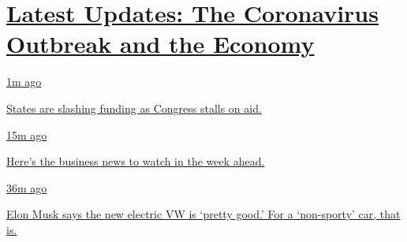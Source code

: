 \hypertarget{latest-updates-the-coronavirus-outbreak-and-the-economy}{%
\section{\texorpdfstring{\href{https://www.nytimes3xbfgragh.onion/live/2020/09/08/business/stock-market-today-coronavirus?action=click\&pgtype=Article\&state=default\&region=MAIN_CONTENT_1\&context=storylines_live_updates}{Latest
Updates: The Coronavirus Outbreak and the
Economy}}{Latest Updates: The Coronavirus Outbreak and the Economy}}\label{latest-updates-the-coronavirus-outbreak-and-the-economy}}

\href{https://www.nytimes3xbfgragh.onion/live/2020/09/08/business/stock-market-today-coronavirus?action=click\&pgtype=Article\&state=default\&region=MAIN_CONTENT_1\&context=storylines_live_updates\#states-are-slashing-funding-as-congress-stalls-on-aid}{1m
ago}

\href{https://www.nytimes3xbfgragh.onion/live/2020/09/08/business/stock-market-today-coronavirus?action=click\&pgtype=Article\&state=default\&region=MAIN_CONTENT_1\&context=storylines_live_updates\#states-are-slashing-funding-as-congress-stalls-on-aid}{States
are slashing funding as Congress stalls on aid.}

\href{https://www.nytimes3xbfgragh.onion/live/2020/09/08/business/stock-market-today-coronavirus?action=click\&pgtype=Article\&state=default\&region=MAIN_CONTENT_1\&context=storylines_live_updates\#heres-the-business-news-to-watch-in-the-week-ahead}{15m
ago}

\href{https://www.nytimes3xbfgragh.onion/live/2020/09/08/business/stock-market-today-coronavirus?action=click\&pgtype=Article\&state=default\&region=MAIN_CONTENT_1\&context=storylines_live_updates\#heres-the-business-news-to-watch-in-the-week-ahead}{Here's
the business news to watch in the week ahead.}

\href{https://www.nytimes3xbfgragh.onion/live/2020/09/08/business/stock-market-today-coronavirus?action=click\&pgtype=Article\&state=default\&region=MAIN_CONTENT_1\&context=storylines_live_updates\#elon-musk-says-the-new-electric-vw-is-pretty-good-for-a-non-sporty-car-that-is}{36m
ago}

\href{https://www.nytimes3xbfgragh.onion/live/2020/09/08/business/stock-market-today-coronavirus?action=click\&pgtype=Article\&state=default\&region=MAIN_CONTENT_1\&context=storylines_live_updates\#elon-musk-says-the-new-electric-vw-is-pretty-good-for-a-non-sporty-car-that-is}{Elon
Musk says the new electric VW is `pretty good.' For a `non-sporty' car,
that is.}

